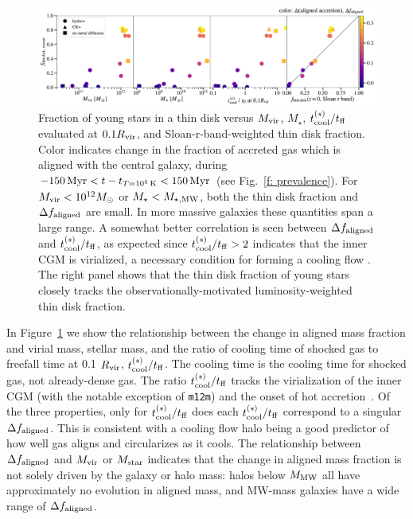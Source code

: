 \documentclass[fleqn,usenatbib]{mnras}
\newcommand{\tcon}{t_{T=10^5\,{\rm K}}}
\begin{document}
\subsection{}

\begin{figure}
    \centering
    \includegraphics[width=\textwidth]{figures/prevalence/aligned_fraction_vs_galaxy_props.pdf}
    \caption{
    Fraction of young stars in a thin disk versus $M_{\rm vir}$, $M_\star$, $t_{\rm cool}^{(s)}/t_{\rm ff}$ evaluated at $0.1 R_{\rm vir}$, and Sloan-r-band-weighted thin disk fraction.
    Color indicates change in the fraction of accreted gas which is aligned with the central galaxy, during $-150\,{\rm Myr} < t-\tcon < 150\,{\rm Myr}$ (see Fig.~\ref{f: prevalence}).
    For $M_{\rm vir} < 10^{12} M_\odot$ or $M_\star < M_{\star, {\rm MW}}$, both the thin disk fraction and $\Delta f_{\rm aligned}$ are small. In more massive galaxies these quantities span a large range. A somewhat better correlation is seen between $\Delta f_{\rm aligned}$ and $t_{\rm cool}^{(s)}/t_{\rm ff}$, as expected since $t_{\rm cool}^{(s)}/t_{\rm ff}>2$ indicates that the inner CGM is virialized, a necessary condition for forming a cooling flow \citep{Stern2021}.
    The right panel shows that the thin disk fraction of young stars closely tracks the observationally-motivated luminosity-weighted thin disk fraction.
    }
    \label{f: prevalence vs galaxy properties}
\end{figure}

In Figure~\ref{f: prevalence vs galaxy properties} we show the relationship between the change in aligned mass fraction and virial mass, stellar mass, and the ratio of cooling time of shocked gas to freefall time at 0.1 $R_{\rm vir}$, $t_{\rm cool}^{(s)} / t_{\rm ff}$.
The cooling time is the cooling time for shocked gas, not already-dense gas.
The ratio $t_{\rm cool}^{(s)} / t_{\rm ff}$ tracks the virialization of the inner CGM (with the notable exception of \texttt{m12m}) and the onset of hot accretion~\citep{Stern2020}.
Of the three properties, only for $t_{\rm cool}^{(s)} / t_{\rm ff}$ does each $t_{\rm cool}^{(s)} / t_{\rm ff}$ correspond to a singular $\Delta f_{\rm aligned}$.
This is consistent with a cooling flow halo being a good predictor of how well gas aligns and circularizes as it cools.
The relationship between $\Delta f_{\rm aligned}$ and $M_{\rm vir}$ or $M_{\rm star}$ indicates that the change in aligned mass fraction is not solely driven by the galaxy or halo mass:
halos below $M_{\rm MW}$ all have approximately no evolution in aligned mass, and MW-mass galaxies have a wide range of $\Delta f_{\rm aligned}$.
\end{document}
